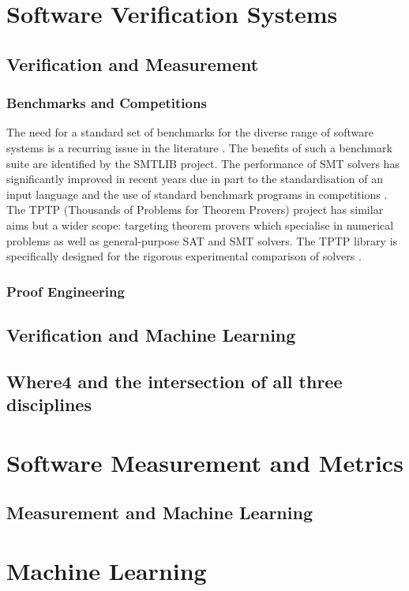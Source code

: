    


\section{Software Verification Systems}

\subsection{Verification and Measurement}

\subsubsection{Benchmarks and Competitions}

The need for a standard set of benchmarks for the diverse range of software systems is a recurring issue in the literature \cite{Dagstuhl}. The benefits of such a benchmark suite are identified by the SMTLIB \cite{SMTLIB} project. The performance of SMT solvers has significantly improved in recent years due in part to the standardisation of an input language and the use of standard benchmark programs in  competitions \cite{SMTEVAL2013}\cite{SVCOMP}. The TPTP (Thousands of Problems for Theorem Provers) project \cite{TPTP} has similar aims but a wider scope: targeting theorem provers which specialise in numerical problems as well as general-purpose SAT and SMT solvers. The TPTP library is specifically designed for the rigorous experimental comparison of solvers \cite{Sutcliffe200139}.

\subsubsection{Proof Engineering}

\subsection{Verification and Machine Learning}

\subsection{Where4 and the intersection of all three disciplines}

\section{Software Measurement and Metrics}


\subsection{Measurement and Machine Learning}

\section{Machine Learning}
